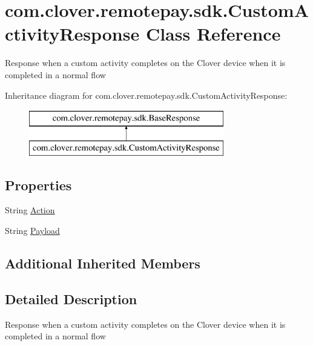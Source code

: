 \hypertarget{classcom_1_1clover_1_1remotepay_1_1sdk_1_1_custom_activity_response}{}\section{com.\+clover.\+remotepay.\+sdk.\+Custom\+Activity\+Response Class Reference}
\label{classcom_1_1clover_1_1remotepay_1_1sdk_1_1_custom_activity_response}


Response when a custom activity completes on the Clover device when it is completed in a normal flow  


Inheritance diagram for com.\+clover.\+remotepay.\+sdk.\+Custom\+Activity\+Response\+:\begin{figure}[H]
\begin{center}
\leavevmode
\includegraphics[height=2.000000cm]{classcom_1_1clover_1_1remotepay_1_1sdk_1_1_custom_activity_response}
\end{center}
\end{figure}
\subsection*{Properties}
\begin{DoxyCompactItemize}
\item 
String \hyperlink{classcom_1_1clover_1_1remotepay_1_1sdk_1_1_custom_activity_response_a10bbbb5aad053eb21bc6a4c51524a04e}{Action}
\item 
String \hyperlink{classcom_1_1clover_1_1remotepay_1_1sdk_1_1_custom_activity_response_a11223ec6dbba1c9f09481e3ccfc2352c}{Payload}
\end{DoxyCompactItemize}
\subsection*{Additional Inherited Members}


\subsection{Detailed Description}
Response when a custom activity completes on the Clover device when it is completed in a normal flow 



